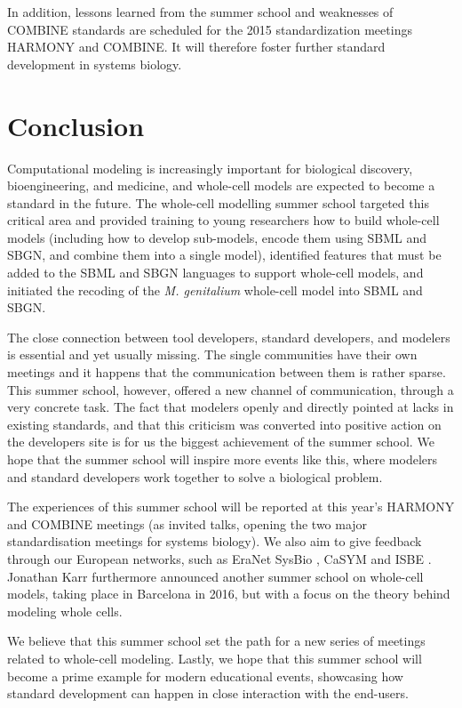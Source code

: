 \documentclass[journal,transmag]{IEEEtran}
\begin{document}
In addition, lessons learned from the summer school and weaknesses of COMBINE standards are scheduled for the 2015 standardization meetings HARMONY and COMBINE.  It will therefore foster further standard development in systems biology. 

\section{Conclusion}
Computational modeling is increasingly important for biological discovery, bioengineering, and medicine, and whole-cell models are expected to become a standard in the future. 
The whole-cell modelling summer school targeted this critical area and  provided  training to young researchers how to build whole-cell models (including how to develop sub-models, encode them using SBML and SBGN, and  combine them into a single model), identified features that must be added to the SBML and SBGN languages to support  whole-cell models, and initiated the recoding of the \textit{M. genitalium} whole-cell model into SBML and SBGN.

The close connection between tool developers, standard developers, and modelers is essential and yet usually missing. 
The single communities have their own meetings and it happens that the communication between them is rather sparse. 
This summer school, however, offered a new channel of communication, through a very concrete task. 
The fact that modelers openly and directly pointed at lacks in existing standards, and that this criticism was converted into positive action on the developers site is for us the biggest achievement of the summer school. 
We hope that the summer school will inspire more events like this, where modelers and standard developers work together to solve a biological problem.

The experiences of this summer school will be reported at this year's HARMONY and COMBINE meetings (as invited talks, opening the two major standardisation meetings for
systems biology). 
We also aim to give feedback through our European networks, such as EraNet SysBio \cite{ERASysBio2015}, CaSYM \cite{CaSYM2015} and ISBE \cite{Wolkenhauer2009}.
Jonathan Karr furthermore announced another summer school on whole-cell models, taking place in Barcelona in 2016, but with a focus on the theory behind modeling whole cells.

We believe that this summer school set the path for a new series of meetings related to whole-cell modeling.
Lastly, we hope that this summer school will become a prime example for modern educational events, showcasing how standard development can happen in close interaction with the end-users.
\end{document}
